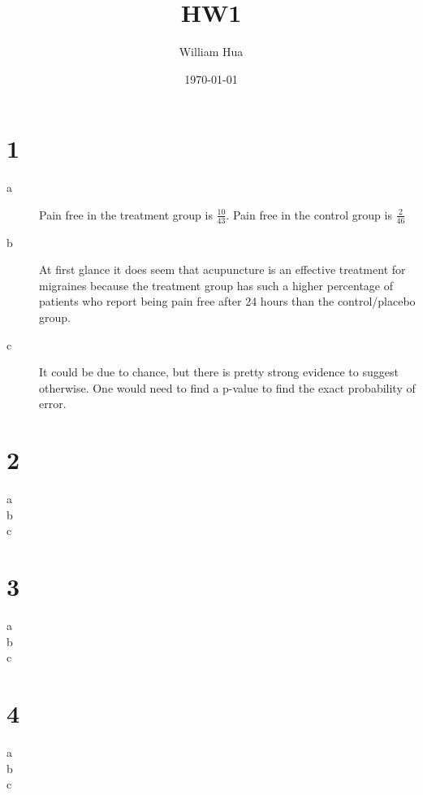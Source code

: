 \documentclass[12pt]{article}
\title{\vspace*{-3em}HW1}
\author{William Hua}
\date{\today}
\begin{document}
\maketitle

\section*{1}
\begin{description}
\item[a] Pain free in the treatment group is $\frac{10}{43}$. Pain free in the 
    control group is $\frac{2}{46}$
\item[b] At first glance it does seem that acupuncture is an effective treatment
    for migraines because the treatment group has such a higher percentage of 
    patients who report being pain free after 24 hours than the control/placebo
    group.
\item[c] It could be due to chance, but there is pretty strong evidence to 
    suggest otherwise. One would need to find a p-value to find the exact
    probability of error.
\end{description}

\section*{2}
\begin{description}
\item[a]
\item[b]
\item[c]
\end{description}

\section*{3}
\begin{description}
\item[a]
\item[b]
\item[c]
\end{description}

\section*{4}
\begin{description}
\item[a]
\item[b]
\item[c]
\end{description}
\end{document}
